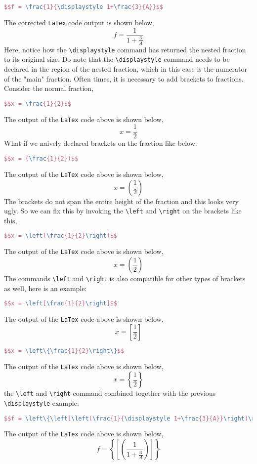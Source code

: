 \documentclass[a4paper, 12pt]{report}
\begin{document}
\begin{center}
\begin{lstlisting}[language=tex]
$$f = \frac{1}{\displaystyle 1+\frac{3}{A}}$$
\end{lstlisting}
The corrected \texttt{LaTex} code output is shown below,
$$f = \frac{1}{\displaystyle 1+\frac{3}{A}}$$
Here, notice how the \texttt{\textbackslash displaystyle} command has returned the nested fraction to its original size. Do note that the \texttt{\textbackslash displaystyle} command needs to be declared in the region of the nested fraction, which in this case is the numerator of the "main" fraction. Often times, it is necessary to add brackets to fractions. Consider the normal fraction,
\begin{lstlisting}[language=tex]
$$x = \frac{1}{2}$$
\end{lstlisting}
The output of the \texttt{LaTex} code above is shown below,
$$x = \frac{1}{2}$$
What if we naively declared brackets on the fraction like below:
\begin{lstlisting}[language=tex]
$$x = (\frac{1}{2})$$
\end{lstlisting}
The output of the \texttt{LaTex} code above is shown below,
$$x = (\frac{1}{2})$$
The brackets do not span the entire height of the fraction and this looks very ugly. So we can fix this by invoking the \texttt{\textbackslash left} and \texttt{\textbackslash right} on the brackets like this,
\begin{lstlisting}[language=tex]
$$x = \left(\frac{1}{2}\right)$$
\end{lstlisting}
The output of the \texttt{LaTex} code above is shown below,
$$x = \left(\frac{1}{2}\right)$$
The commands \texttt{\textbackslash left} and \texttt{\textbackslash right} is also compatible for other types of brackets as well, here is an example:
\begin{lstlisting}[language=tex]
$$x = \left[\frac{1}{2}\right]$$
\end{lstlisting}
The output of the \texttt{LaTex} code above is shown below,
$$x = \left[\frac{1}{2}\right]$$
\begin{lstlisting}[language=tex]
$$x = \left\{\frac{1}{2}\right\}$$
\end{lstlisting}
The output of the \texttt{LaTex} code above is shown below,
$$x = \left\{\frac{1}{2}\right\}$$
the \texttt{\textbackslash left} and \texttt{\textbackslash right} command combined together with the previous \texttt{\textbackslash displaystyle} example:
\begin{lstlisting}[language=tex]
$$f = \left\{\left[\left(\frac{1}{\displaystyle 1+\frac{3}{A}}\right)\right]\right\}$$
\end{lstlisting}
The output of the \texttt{LaTex} code above is shown below,
$$f = \left\{\left[\left(\frac{1}{\displaystyle 1+\frac{3}{A}}\right)\right]\right\}$$


\end{center}
\end{document}
